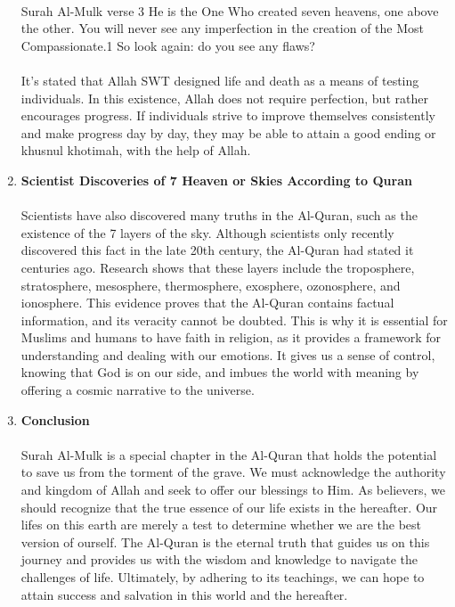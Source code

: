 \documentclass[12pt,titlepage]{article}
\begin{document}
\begin{enumerate}[label=\textbf{\Alph*.}]
    \paragraph{} 
     Surah Al-Mulk verse 3 He is the One Who created seven heavens, one above the other. You will never see any imperfection in the creation of the Most Compassionate.1 So look again: do you see any flaws?
    \paragraph{}
     It's stated that Allah SWT designed life and death as a means of testing individuals. In this existence, Allah does not require perfection, but rather encourages progress. If individuals strive to improve themselves consistently and make progress day by day, they may be able to attain a good ending or khusnul khotimah, with the help of Allah.
    \item \textbf{Scientist Discoveries of 7 Heaven or Skies According to Quran}
    \paragraph{}
    Scientists have also discovered many truths in the Al-Quran, such as the existence of the 7 layers of the sky. Although scientists only recently discovered this fact in the late 20th century, the Al-Quran had stated it centuries ago. Research shows that these layers include the troposphere, stratosphere, mesosphere, thermosphere, exosphere, ozonosphere, and ionosphere. This evidence proves that the Al-Quran contains factual information, and its veracity cannot be doubted. This is why it is essential for Muslims and humans to have faith in religion, as it provides a framework for understanding and dealing with our emotions. It gives us a sense of control, knowing that God is on our side, and imbues the world with meaning by offering a cosmic narrative to the universe.
    \item \textbf{Conclusion}
    \paragraph{} Surah Al-Mulk is a special chapter in the Al-Quran that holds the potential to save us from the torment of the grave. We must acknowledge the authority and kingdom of Allah and seek to offer our blessings to Him. As believers, we should recognize that the true essence of our life exists in the hereafter. Our lifes on this earth are merely a test to determine whether we are the best version of ourself. The Al-Quran is the eternal truth that guides us on this journey and provides us with the wisdom and knowledge to navigate the challenges of life. Ultimately, by adhering to its teachings, we can hope to attain success and salvation in this world and the hereafter.
\end{enumerate}
\end{document}
